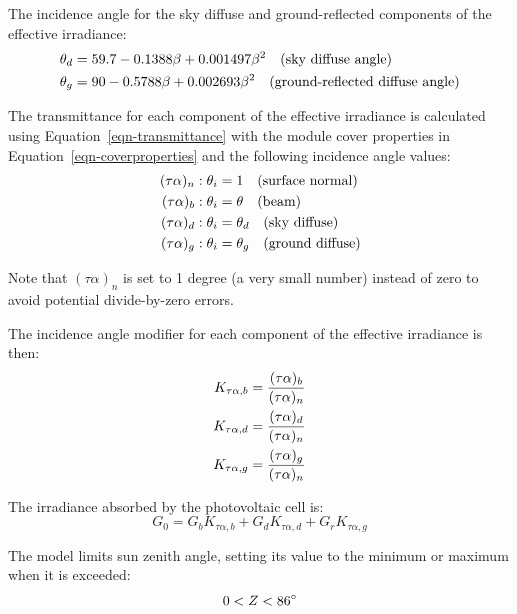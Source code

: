 \documentclass[12pt,letterpaper]{article}
\begin{document}
The incidence angle for the sky diffuse and ground-reflected components of the effective irradiance:
\begin{align}
\theta_d &= 59.7 - 0.1388 \beta + 0.001497 \beta^2 \quad\text{(sky diffuse angle)} \notag\\
\theta_g &= 90 - 0.5788 \beta  + 0.002693 \beta^2 \quad\text{(ground-reflected diffuse angle)} 
\end{align}

The transmittance for each component of the effective irradiance is calculated using Equation~\ref{eqn-transmittance} with the module cover properties in Equation~\ref{eqn-coverproperties} and the following incidence angle values:
\begin{align}
(\tau\alpha)_n: \theta_i &= 1 \quad\text{(surface normal)} \notag\\
(\tau\alpha)_b: \theta_i &= \theta \quad\text{(beam)} \notag\\
(\tau\alpha)_d: \theta_i &= \theta_d \quad\text{(sky diffuse)} \notag\\
(\tau\alpha)_g: \theta_i &= \theta_g  \quad\text{(ground diffuse)}
\end{align}

Note that $(\tau\alpha)_n$ is set to 1 degree (a very small number) instead of zero to avoid potential divide-by-zero errors.

The incidence angle modifier for each component of the effective irradiance is then:
\begin{align}
K_{\tau\alpha,b} = \frac{(\tau\alpha)_b}{(\tau\alpha)_n} \notag\\
K_{\tau\alpha,d} = \frac{(\tau\alpha)_d}{(\tau\alpha)_n} \notag\\
K_{\tau\alpha,g} = \frac{(\tau\alpha)_g}{(\tau\alpha)_n}
\end{align}

The irradiance absorbed by the photovoltaic cell is:
\begin{equation}
G_0 = G_b K_{\tau\alpha,b} + G_d K_{\tau\alpha,d} + G_r K_{\tau\alpha,g}
\end{equation}

The model limits sun zenith angle, setting its value to the minimum or maximum when it is exceeded:
\begin{equation}
0 < Z < 86\degree  
\end{equation}
\end{document}
